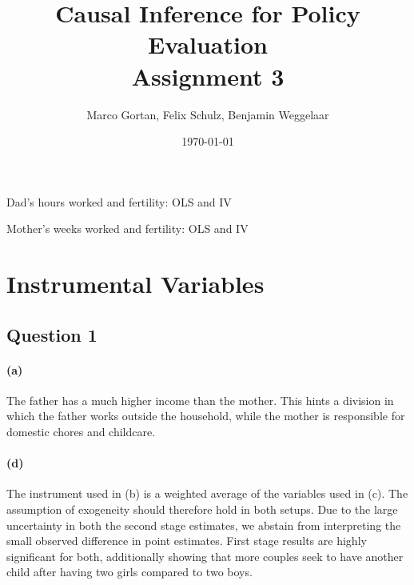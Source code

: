 \documentclass{scrartcl}
\title{Causal Inference for Policy Evaluation\\
\Large{Assignment 3}}
\author{Marco Gortan, Felix Schulz, Benjamin Weggelaar}
\date{\today}
\begin{document}
\maketitle

\begin{table}[htbp]
  \footnotesize
  \centering
  \begin{minipage}{0.6\textwidth}
    \centering
    \caption{Dad's hours worked and fertility: OLS and IV}
  \end{minipage}
  \hspace{.5cm}
  \begin{minipage}{0.3\textwidth}
    \centering
    \caption{Mother's weeks worked and fertility: OLS and IV}
  \end{minipage}
\end{table}

\section*{Instrumental Variables}

\subsection*{Question 1}

\paragraph*{(a)}

The father has a much higher income than the mother. This hints a division in which the father works outside the household, while the mother is responsible for domestic chores and childcare.



\paragraph*{(d)}

The instrument used in (b) is a weighted average of the variables used in (c). The assumption of exogeneity should therefore hold in both setups. Due to the large uncertainty in both the second stage estimates, we abstain from interpreting the small observed difference in point estimates. First stage results are highly significant for both, additionally showing that more couples seek to have another child after having two girls compared to two boys.
\end{document}
